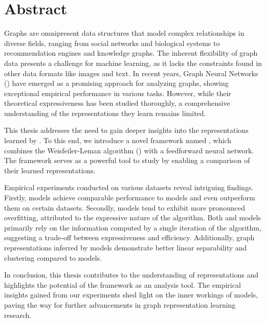 \chapter*{Abstract}

Graphs are omnipresent data structures that model complex relationships in diverse fields, ranging from social networks and biological systems to recommendation engines and knowledge graphs. The inherent flexibility of graph data presents a challenge for machine learning, as it lacks the constraints found in other data formats like images and text. In recent years, \textsf{Graph Neural Networks} (\gnns) have emerged as a promising approach for analyzing graphs, showing exceptional empirical performance in various tasks. However, while their theoretical expressiveness has been studied thoroughly, a comprehensive understanding of the representations they learn remains limited.

This thesis addresses the need to gain deeper insights into the representations learned by \gnns. To this end, we introduce a novel framework named \wlnn, which combines the Weisfeiler-Leman algorithm (\wl) with a feedforward neural network. The \wlnn framework serves as a powerful tool to study \gnns by enabling a comparison of their learned representations.

Empirical experiments conducted on various datasets reveal intriguing findings. Firstly, \wlnn models achieve comparable performance to \gnn models and even outperform them on certain datasets. Secondly, \wlnn models tend to exhibit more pronounced overfitting, attributed to the expressive nature of the \wl algorithm. Both \wlnn and \gnn models primarily rely on the information computed by a single iteration of the \wl algorithm, suggesting a trade-off between expressiveness and efficiency. Additionally, graph representations inferred by \gnn models demonstrate better linear separability and clustering compared to \wlnn models.

In conclusion, this thesis contributes to the understanding of \gnn representations and highlights the potential of the \wlnn framework as an analysis tool. The empirical insights gained from our experiments shed light on the inner workings of \gnn models, paving the way for further advancements in graph representation learning research.